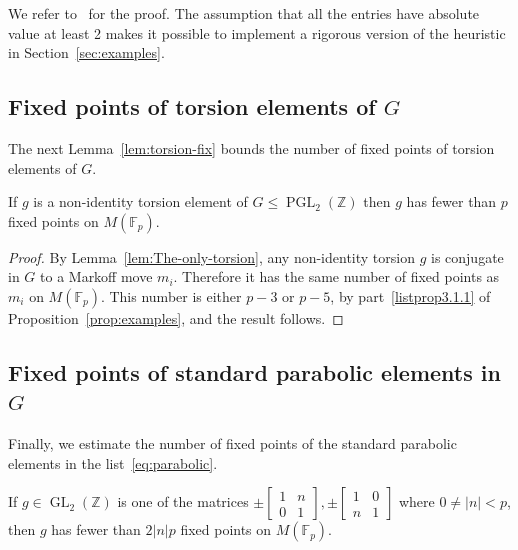 \documentclass[AHL, Unicode, longabstracts, published]{cedram}
\newcommand{\Z}{\mathbb{Z}}
\newcommand{\F}{\mathbb{F}}
\DeclareMathOperator{\GL}{GL}
\DeclareMathOperator{\PGL}{PGL}
\DeclareMathOperator{\GL}{GL}
\newcommand{\Z}{\mathbb{Z}}
\begin{document}
We refer to~\cite{CGMP} for the proof. The assumption that all the entries have absolute value at least 2 makes it possible to implement a rigorous version of the heuristic in Section~\ref{sec:examples}.

\goodbreak
\subsection{Fixed points of torsion elements of \texorpdfstring{$G$}{G}}
The next Lemma~\ref{lem:torsion-fix} bounds the number of fixed points of torsion elements of $G$.

\begin{lemm}\label{lem:torsion-fix}
If $g$ is a non-identity torsion element of $G\leq\PGL_{2}(\Z)$ then $g$ has fewer than $p$ fixed points on $M(\F_{p})$.
\end{lemm}


\begin{proof}
By Lemma~\ref{lem:The-only-torsion}, any non-identity torsion $g$ is conjugate in $G$ to a Markoff move $m_{i}$. Therefore it has the same number of fixed points as $m_{i}$ on $M(\F_{p})$. This number is either $p-3$ or $p-5$, by part~\eqref{listprop3.1.1} of Proposition~\ref{prop:examples}, and the result follows.
\end{proof}

\subsection{Fixed points of standard parabolic elements in \texorpdfstring{$G$}{G}}
Finally, we estimate the number of fixed points of the standard parabolic elements in the list~\eqref{eq:parabolic}.

\begin{prop}\label{prop:parabolic}
If $g\in\GL_{2}(\Z)$ is one of the matrices $\pm\left[
\begin{smallmatrix}1 & n\\
0 & 1
\end{smallmatrix}\right],\pm
\left[\begin{smallmatrix}1 & 0\\
n & 1
\end{smallmatrix}\right]$ where $0 \neq |n| < p$, then $g$ has fewer than $2|n|p$ fixed points on $M(\F_{p})$.
\end{prop}
\end{document}
